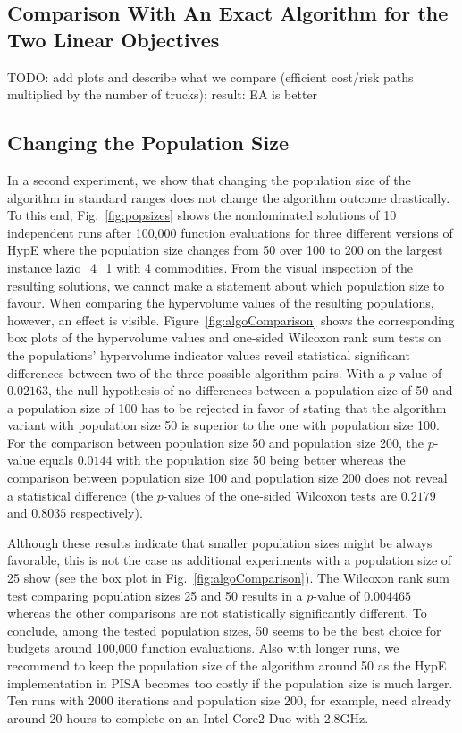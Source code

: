 \documentclass[preprint,12pt]{elsarticle}
\newcommand{\TODO}[1]{{\color{red}TODO: #1}}
\begin{document}
\subsection{Comparison With An Exact Algorithm for the Two Linear Objectives}
\TODO{add plots and describe what we compare (efficient cost/risk paths multiplied by the number of trucks); result: EA is better}

\subsection{Changing the Population Size}
In a second experiment, we show that changing the population size of the algorithm in standard ranges does not change the algorithm outcome drastically. To this end, Fig.~\ref{fig:popsizes} shows the nondominated solutions of 10 independent runs after 100,000 function evaluations for three different versions of HypE where the population size changes from 50 over 100 to 200 on the largest instance lazio\_4\_1 with 4 commodities. From the visual inspection of the resulting solutions, we cannot make a statement about which population size to favour. When comparing the hypervolume values of the resulting populations, however, an effect is visible. Figure~\ref{fig:algoComparison} shows the corresponding box plots of the hypervolume values and one-sided Wilcoxon rank sum tests on the populations' hypervolume indicator values reveil statistical significant differences between two of the three possible algorithm pairs. With a $p$-value of $0.02163$, the null hypothesis of no differences between a population size of 50 and a population size of 100 has to be rejected in favor of stating that the algorithm variant with population size 50 is superior to the one with population size 100. For the comparison between population size 50 and population size 200, the $p$-value equals $0.0144$ with the population size 50 being better whereas the comparison between population size 100 and population size 200 does not reveal a statistical difference (the $p$-values of the one-sided Wilcoxon tests are $0.2179$ and $0.8035$ respectively). 

Although these results indicate that smaller population sizes might be always favorable, this is not the case as additional experiments with a population size of 25 show (see the box plot in Fig.~\ref{fig:algoComparison}). The Wilcoxon rank sum test comparing population sizes 25 and 50 results in a $p$-value of $0.004465$ whereas the other comparisons are not statistically significantly different. To conclude, among the tested population sizes, 50 seems to be the best choice for budgets around 100,000 function evaluations. Also with longer runs, we recommend to keep the population size of the algorithm around 50 as the HypE implementation in PISA becomes too costly if the population size is much larger. Ten runs with 2000 iterations and population size 200, for example, need already around 20 hours to complete on an Intel Core2 Duo with 2.8GHz.
\end{document}
